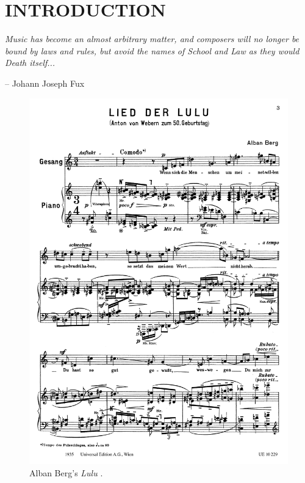 \chapter{INTRODUCTION}

\vspace{3em}
\setlength{\epigraphwidth}{0.86\textwidth}
\setlength{\epigraphrule}{0pt}
\epigraph{
	\textit{Music has become an almost arbitrary matter, and composers will no longer be bound by laws and rules, but avoid the names of School and Law as they would Death itself...}
}{\vspace{2em}-- Johann Joseph Fux}
\vspace{1em}

\begin{figure}[htbp]
    \centering
	\includegraphics[width=6.5in]{figures/berg1.pdf}
	\caption[Berg's \emph{Lulu}]{Alban Berg's \emph{Lulu} \cite[182]{Starr1984}.}
	\label{fig:berg-lulu}
\end{figure}

